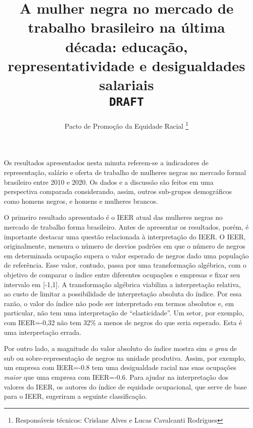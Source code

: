 \documentclass[12pt]{article}
\begin{document}
 

\linespread{1.1}

\title{%
  A mulher negra no mercado de trabalho brasileiro na última década: educação, representatividade e desigualdades salariais\\
  \vspace{1cm}
  \Large \texttt{\MakeUppercase{DRAFT}}}

\author{Pacto de Promoção da Equidade Racial \thanks{Responsáveis técnicos: Crislane Alves e Lucas Cavalcanti Rodrigues}}


\maketitle

\par Os resultados apresentados nesta minuta referem-se a indicadores de representação, salário e oferta de trabalho de mulheres negras no mercado formal brasileiro entre 2010 e 2020. Os dados e a discussão são feitos em uma perspectiva comparada considerando, assim, outros sub-grupos demográficos como homens negros, e homens e mulheres brancos.

\par O primeiro resultado apresentado é o IEER atual das mulheres negras no mercado de trabalho forma brasileiro. Antes de apresentar os resultados, porém, é importante destacar uma questão relacionada à interpretação do IEER. O IEER, originalmente, mensura o número de desvios padrões em que o número de negros em determinada ocupação supera o valor esperado de negros dado uma população de referência. Esse valor, contudo, passa por uma transformação algébrica, com o objetivo de comparar o índice entre diferentes ocupações e empresas e fixar seu intervalo em [-1,1]. A transformação algébrica viabiliza a interpretação relativa, ao custo de limitar a possibilidade de interpretação absoluta do índice. Por essa razão, o valor do índice não pode ser interpretado em termos absolutos e, em particular, não tem uma interpretação de \enquote{elasticidade}. Um setor, por exemplo, com IEER=-0,32 não tem 32\% a menos de negros do que seria esperado. Esta é uma interpretação errada.

\par Por outro lado, a magnitude do valor absoluto do índice mostra sim \textit{o grau} de sub ou sobre-representação de negros na unidade produtiva. Assim, por exemplo, um empresa com IEER=-0.8 tem uma desigualdade racial nas suas ocupações \textit{maior} que uma empresa com IEER=-0.6. Para ajudar na interpretação dos valores do IEER, os autores do índice de equidade ocupacional, que serve de base para o IEER, sugeriram a seguinte classificação.\autocite{ransom2001one}
\end{document}
